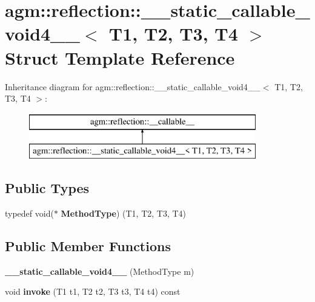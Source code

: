 \hypertarget{structagm_1_1reflection_1_1____static__callable__void4____}{}\section{agm\+:\+:reflection\+:\+:\+\_\+\+\_\+static\+\_\+callable\+\_\+void4\+\_\+\+\_\+$<$ T1, T2, T3, T4 $>$ Struct Template Reference}
\label{structagm_1_1reflection_1_1____static__callable__void4____}
Inheritance diagram for agm\+:\+:reflection\+:\+:\+\_\+\+\_\+static\+\_\+callable\+\_\+void4\+\_\+\+\_\+$<$ T1, T2, T3, T4 $>$\+:\begin{figure}[H]
\begin{center}
\leavevmode
\includegraphics[height=2.000000cm]{structagm_1_1reflection_1_1____static__callable__void4____}
\end{center}
\end{figure}
\subsection*{Public Types}
\begin{DoxyCompactItemize}
\item 
typedef void($\ast$ {\bfseries Method\+Type}) (T1, T2, T3, T4)\hypertarget{structagm_1_1reflection_1_1____static__callable__void4_____a5bf39f914e3530137582142844c2e108}{}\label{structagm_1_1reflection_1_1____static__callable__void4_____a5bf39f914e3530137582142844c2e108}

\end{DoxyCompactItemize}
\subsection*{Public Member Functions}
\begin{DoxyCompactItemize}
\item 
{\bfseries \+\_\+\+\_\+static\+\_\+callable\+\_\+void4\+\_\+\+\_\+} (Method\+Type m)\hypertarget{structagm_1_1reflection_1_1____static__callable__void4_____a0474efd9f3bbe40292d5234dada88798}{}\label{structagm_1_1reflection_1_1____static__callable__void4_____a0474efd9f3bbe40292d5234dada88798}

\item 
void {\bfseries invoke} (T1 t1, T2 t2, T3 t3, T4 t4) const \hypertarget{structagm_1_1reflection_1_1____static__callable__void4_____a25d9165c64de8fc7667863fad9957b6b}{}\label{structagm_1_1reflection_1_1____static__callable__void4_____a25d9165c64de8fc7667863fad9957b6b}

\end{DoxyCompactItemize}
